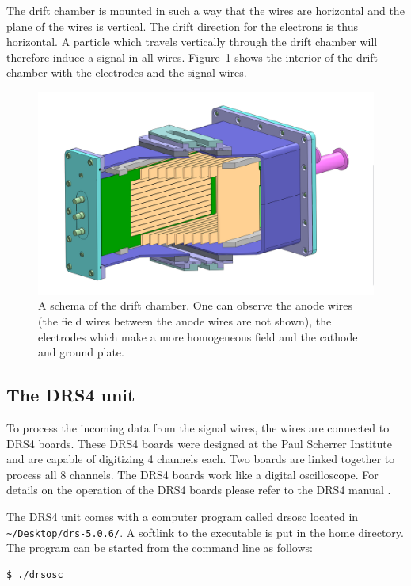 \documentclass[12pt]{article}
\begin{document}
The drift chamber is mounted in such a way that the wires are horizontal and the plane of the wires is vertical. The drift direction for the electrons is thus horizontal. A particle which travels vertically through the drift chamber will therefore induce a signal in all wires. Figure~\ref{fig:CAD} shows the interior of the drift chamber with the electrodes and the signal wires. 

\begin{figure}[h]
\includegraphics[width=13cm]{pics/Driftkammer_Ansicht_5.png}
\centering
\caption{A schema of the drift chamber. One can observe the anode wires (the field wires between the anode wires are not shown), the electrodes which make a more homogeneous field and the cathode and ground plate.}
\label{fig:CAD}
\end{figure}

\subsection{The DRS4 unit}
To process the incoming data from the signal wires, the wires are connected to DRS4 boards. These DRS4 boards were designed at the Paul Scherrer Institute and are capable of digitizing 4 channels each. Two boards are linked together to process all 8 channels. The DRS4 boards work like a digital oscilloscope. For details on the operation of the DRS4 boards please refer to the DRS4 manual \cite{DRS4_manual}.

The DRS4 unit comes with a computer program called drsosc located in \verb|~/Desktop/drs-5.0.6/|. A softlink to the executable is put in the home directory. The program can be started from the command line as follows: 

\begin{lstlisting}[language=bash]
$ ./drsosc
\end{lstlisting}
\end{document}

